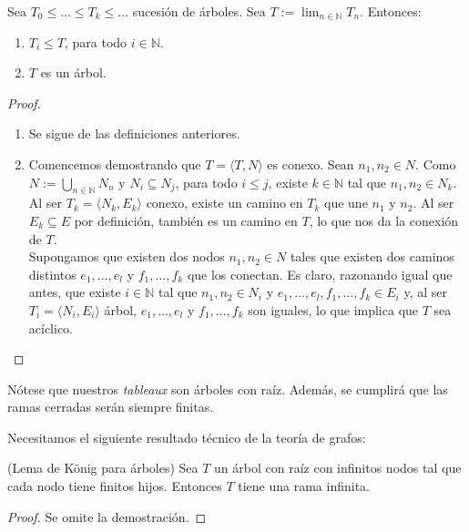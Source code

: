 \begin{prop}
Sea $T_0 \leq \dots \leq T_k \leq \dots$ sucesión de árboles. Sea $T := \lim_{n \in \mathbb{N}} T_n$. Entonces:
\begin{enumerate}
    \item $T_i \leq T$, para todo $i \in \mathbb{N}$.
    \item $T$ es un árbol.
\end{enumerate}
\end{prop}
\begin{proof}\mbox{}
\begin{enumerate}
    \item Se sigue de las definiciones anteriores.
    \item Comencemos demostrando que $T = \langle T, N\rangle$ es conexo. Sean $n_1, n_2 \in N$. Como $N := \bigcup_{n\in \mathbb{N}} N_{n}$ y $N_i \subseteq N_j$, para todo $i \leq j$, existe $k \in \mathbb{N}$ tal que $n_1, n_2 \in N_k$. Al ser $T_k = \langle N_k, E_k\rangle$ conexo, existe un camino en $T_k$ que une $n_1$ y $n_2$. Al ser $E_k \subseteq E$ por definición, también es un camino en $T$, lo que nos da la conexión de $T$. \\
    
    Supongamos que existen dos nodos $n_1, n_2 \in N$ tales que existen dos caminos distintos $e_1, \dots, e_l$ y $f_1, \dots, f_k$ que los conectan. Es claro, razonando igual que antes, que existe $i \in \mathbb{N}$ tal que $n_1, n_2 \in N_i$ y $e_1, \dots, e_l, f_1, \dots, f_k \in E_i$ y, al ser $T_i = \langle N_i, E_i\rangle$ árbol, $e_1, \dots, e_l$ y $f_1, \dots, f_k$ son iguales, lo que implica que $T$ sea acíclico.
\end{enumerate}
\end{proof}

Nótese que nuestros \textit{tableaux} son árboles con raíz. Además, se cumplirá que las ramas cerradas serán siempre finitas.


Necesitamos el siguiente resultado técnico de la teoría de grafos:

\begin{theorem}(Lema de König para árboles)\label{konig}
\mbox{}
Sea $T$ un árbol con raíz con infinitos nodos tal que cada nodo tiene finitos hijos. Entonces $T$ tiene una rama infinita.
\end{theorem}
\begin{proof}
Se omite la demostración.
\end{proof}



